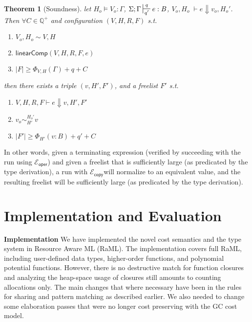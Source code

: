 \documentclass{easychair}
\newtheorem{theorem}{Theorem}
\newcommand{\ms}[1]{\ensuremath{\mathsf{#1}}}
\newcounter{rule}
\newcommand{\wfc}[5]{\mathsf{linearComp}(#1,#2,#3,#4,#5)}
\newcommand{\veq}[4]{#3 \sim^{#1}_{#2} #4}
\newcommand{\copySem}{\ensuremath{\mathcal{E}_{\ms{copy}}}}
\theoremstyle{definition}
\begin{document}
\begin{theorem}[Soundness]
\label{b} let $H_o \vDash V_o : \Gamma$, $\Sigma; \Gamma \sststile{q'}{q} e : B$,
$V_o,H_o \; \vdash e \Downarrow v_o, H_o'$.
Then $\forall C \in \mathbb{Q}^{+}$ and configuration $(V,H,R,F)$ s.t.
\begin{enumerate} 
\item $V_o,H_o \sim V,H$
\item $\wfc{V}{H}{R}{F}{e}$
\item $|F| \ge \Phi_{V,H}(\Gamma) + q + C$ 
\end{enumerate}
then there exists a triple $(v,H',F')$, and a freelist $F'$ s.t.
\begin{enumerate}
  \item $V,H,R,F \vdash e \Downarrow v, H', F'$
	\item $\veq{H_o'}{H'}{v_o}{v}$
  \item $|F'| \ge \Phi_{H'}(v:B) + q' + C$
\end{enumerate}
\end{theorem}

In other words, given a terminating expression (verified by succeeding with the run using $\mathcal{E}_{\ms{oper}}$)
and given a freelist that is sufficiently large (as predicated by the type derivation), 
a run with \copySem will normalize to an equivalent value, and the resulting freelist 
will be sufficiently large (as predicated by the type derivation).


\section{Implementation and Evaluation}
\label{sect:implementation}

{\bf Implementation}
We have implemented the novel cost semantics and the type system in
Resource Aware ML (RaML). The implementation covers full RaML,
including user-defined data types, higher-order functions, and
polynomial potential functions. However, there is no destructive match
for function closures and analyzing the heap-space usage of closures
still amounts to counting allocations only. The main changes that
where necessary have been in the rules for sharing and pattern
matching as described earlier. We also needed to change some
elaboration passes that were no longer cost preserving with
the GC cost model.
\end{document}
